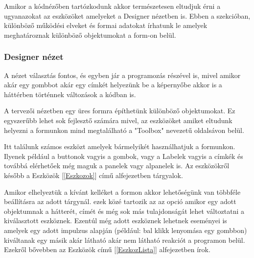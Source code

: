 \documentclass[tocnopagenum]{thesis-ekf}
\theoremstyle{definition}
\theoremstyle{remark}
\begin{document}
	Amikor a kódnézőben tartózkodunk akkor természetesen eltudjuk érni a ugyanazokat az eszközöket amelyeket a Designer nézetben is.
	Ebben a szekcióban, különböző működési elveket és formai adatokat írhatunk le amelyek meghatároznak különböző objektumokat a form-on belül. 
	\subsubsection*{Designer nézet}
	A nézet választás fontos, és egyben jár a programozás részével is, mivel amikor akár egy gombbot akár egy címkét helyezünk be a képernyőbe akkor is a háttérben történnek változások a kódban is.
	
	A tervezői nézetben egy üres formra építhetünk különböző objektumokat.
	Ez egyszerűbb lehet sok fejlesztő számára mivel, az eszközöket amiket eltudunk helyezni a formunkon mind megtalálható a "Toolbox" nevezetű oldalsávon belül.
	
	Itt találunk számos eszközt amelyek bármelyikét használhatjuk a formunkon. Ilyenek például a buttonok vagyis a gombok, vagy a Labelek vagyis a címkék és továbbá elérhetőek még maguk a panelek vagy alpanelek is. Az eszközökről később a  Eszközök [\ref{Eszkozok}] című alfejezetben tárgyalok.
	
	Amikor elhelyeztük a kívánt kelléket a formon akkor lehetőségünk van többféle beállításra az adott tárgynál. ezek közé tartozik az az opció amikor egy adott objektumnak a hátterét, címét és még sok más tulajdonságát lehet változtatni a kiválasztott eszköznek. Ezentúl még adott eszköznek lehetnek eseményei is amelyek egy adott impulzus alapján (például: bal klikk lenyomása egy gombbon) kiváltanak egy másik akár látható akár nem látható reakciót a programon belül. Ezekről bővebben az Eszközök című [\ref{EszkozLista}] alfejezetben írok.
	
\end{document}
